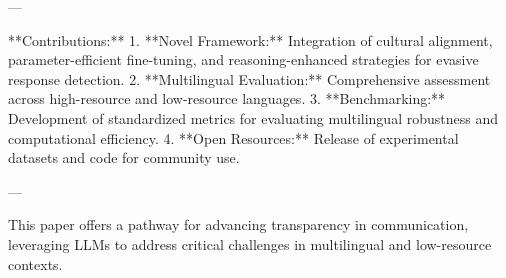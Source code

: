 ---

**Contributions:**  
1. **Novel Framework:** Integration of cultural alignment, parameter-efficient fine-tuning, and reasoning-enhanced strategies for evasive response detection.  
2. **Multilingual Evaluation:** Comprehensive assessment across high-resource and low-resource languages.  
3. **Benchmarking:** Development of standardized metrics for evaluating multilingual robustness and computational efficiency.  
4. **Open Resources:** Release of experimental datasets and code for community use.  

--- 

This paper offers a pathway for advancing transparency in communication, leveraging LLMs to address critical challenges in multilingual and low-resource contexts.